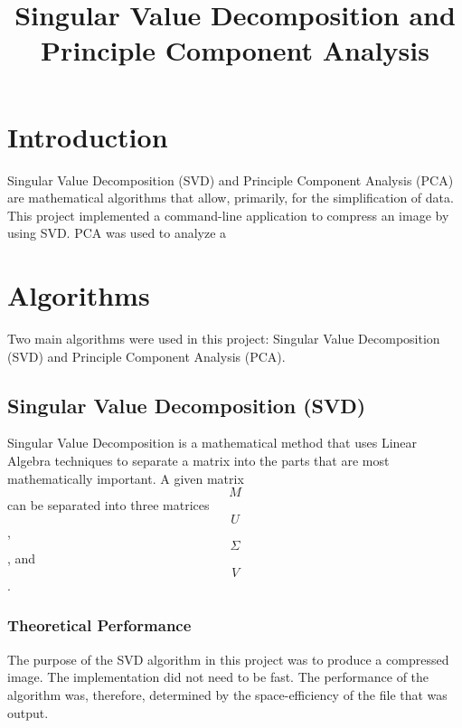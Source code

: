 \documentclass[conference]{IEEEtran}
\begin{document}
\title{Singular Value Decomposition and Principle Component Analysis}


\author{}

\maketitle


\section{Introduction}
Singular Value Decomposition (SVD) and Principle Component Analysis (PCA) are 
mathematical algorithms that allow, primarily, for the simplification of data.
This project implemented a command-line application to compress an image by 
using SVD. PCA was used to analyze a %

\section{Algorithms}\label{algo}
Two main algorithms were used in this project: Singular Value Decomposition (SVD)
and Principle Component Analysis (PCA).

\subsection{Singular Value Decomposition (SVD)}
Singular Value Decomposition is a mathematical method that uses Linear Algebra
techniques to separate a matrix into the parts that are most mathematically 
important. A given matrix $$M$$ can be separated into three matrices $$U$$, 
$$\Sigma$$, and $$V$$.


\subsubsection{Theoretical Performance}
The purpose of the SVD algorithm in this project was to produce a compressed image. 
The implementation did not need to be fast. The performance of the algorithm was, 
therefore, determined by the space-efficiency of the file that was output. 


\end{document}
